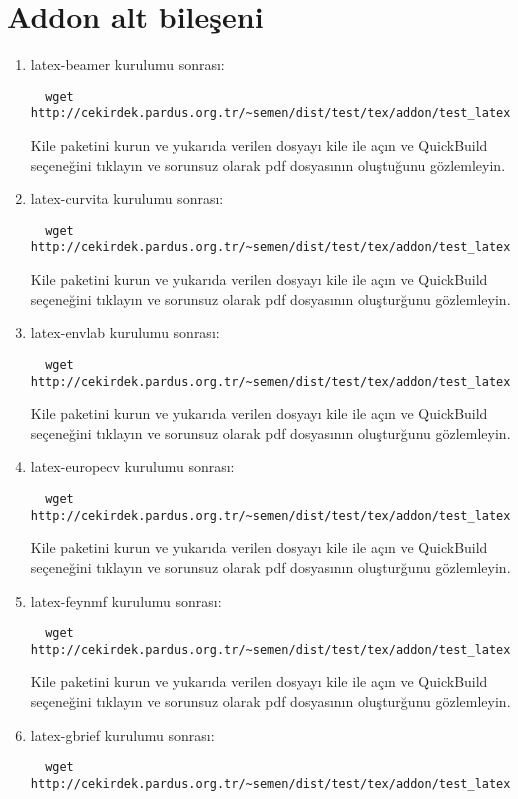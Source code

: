 \documentclass[a4paper,10pt]{article}
\begin{document}
\section{Addon alt bileşeni}
\begin{enumerate}
\item  latex-beamer kurulumu sonrası:
\begin{verbatim}
  wget http://cekirdek.pardus.org.tr/~semen/dist/test/tex/addon/test_latexbeamer.tex
\end{verbatim}

Kile paketini kurun ve yukarıda verilen dosyayı kile ile açın ve QuickBuild  seçeneğini tıklayın ve sorunsuz olarak pdf dosyasının oluştuğunu gözlemleyin.
\item  latex-curvita kurulumu sonrası:
\begin{verbatim}
  wget http://cekirdek.pardus.org.tr/~semen/dist/test/tex/addon/test_latexcurrvita.tex
\end{verbatim}

Kile paketini kurun ve yukarıda verilen dosyayı kile ile açın ve QuickBuild  seçeneğini tıklayın ve sorunsuz olarak pdf dosyasının oluşturğunu gözlemleyin.
\item  latex-envlab kurulumu sonrası:
\begin{verbatim}
  wget http://cekirdek.pardus.org.tr/~semen/dist/test/tex/addon/test_latexenvlab.tex
\end{verbatim}

Kile paketini kurun ve yukarıda verilen dosyayı kile ile açın ve QuickBuild  seçeneğini tıklayın ve sorunsuz olarak pdf dosyasının oluşturğunu gözlemleyin.
\item  latex-europecv kurulumu sonrası:
\begin{verbatim}
  wget http://cekirdek.pardus.org.tr/~semen/dist/test/tex/addon/test_latexeuropecv.tex
\end{verbatim}

Kile paketini kurun ve yukarıda verilen dosyayı kile ile açın ve QuickBuild  seçeneğini tıklayın ve sorunsuz olarak pdf dosyasının oluşturğunu gözlemleyin.
\item  latex-feynmf kurulumu sonrası:
\begin{verbatim}
  wget http://cekirdek.pardus.org.tr/~semen/dist/test/tex/addon/test_latexfeynmf.tex
\end{verbatim}

Kile paketini kurun ve yukarıda verilen dosyayı kile ile açın ve QuickBuild  seçeneğini tıklayın ve sorunsuz olarak pdf dosyasının oluşturğunu gözlemleyin.
\item  latex-gbrief kurulumu sonrası:
\begin{verbatim}
  wget http://cekirdek.pardus.org.tr/~semen/dist/test/tex/addon/test_latexgbrief.tex
\end{verbatim}


\end{enumerate}
\end{document}

